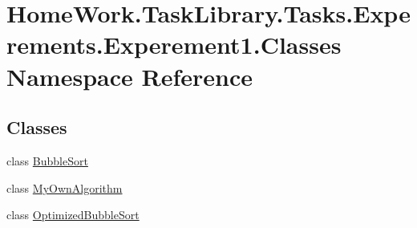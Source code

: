 \hypertarget{namespace_home_work_1_1_task_library_1_1_tasks_1_1_experements_1_1_experement1_1_1_classes}{}\section{Home\+Work.\+Task\+Library.\+Tasks.\+Experements.\+Experement1.\+Classes Namespace Reference}
\label{namespace_home_work_1_1_task_library_1_1_tasks_1_1_experements_1_1_experement1_1_1_classes}
\subsection*{Classes}
\begin{DoxyCompactItemize}
\item 
class \mbox{\hyperlink{class_home_work_1_1_task_library_1_1_tasks_1_1_experements_1_1_experement1_1_1_classes_1_1_bubble_sort}{Bubble\+Sort}}
\item 
class \mbox{\hyperlink{class_home_work_1_1_task_library_1_1_tasks_1_1_experements_1_1_experement1_1_1_classes_1_1_my_own_algorithm}{My\+Own\+Algorithm}}
\item 
class \mbox{\hyperlink{class_home_work_1_1_task_library_1_1_tasks_1_1_experements_1_1_experement1_1_1_classes_1_1_optimized_bubble_sort}{Optimized\+Bubble\+Sort}}
\end{DoxyCompactItemize}

